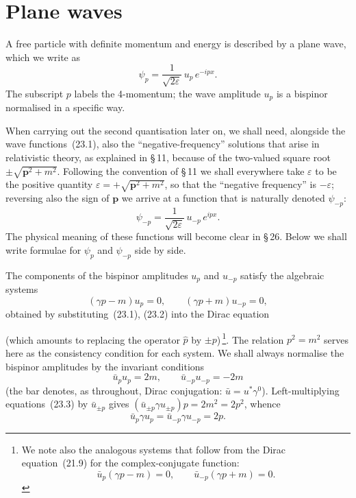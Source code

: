 \section{Plane waves}

A free particle with definite momentum and energy is described by a plane wave, which we write as
\begin{equation}
\psi_p = \frac{1}{\sqrt{2\varepsilon}}\,u_p\,e^{-ipx}.
\tag{23.1}
\end{equation}
The subscript $p$ labels the 4-momentum; the wave amplitude $u_p$ is a bispinor normalised in a specific way.

When carrying out the second quantisation later on, we shall need, alongside the wave functions~(23.1), also the ``negative-frequency'' solutions that arise in relativistic theory, as explained in \S\,11, because of the two-valued square root $\pm\sqrt{\mathbf{p}^2 + m^2}$. Following the convention of \S\,11 we shall everywhere take $\varepsilon$ to be the positive quantity $\varepsilon = +\sqrt{\mathbf{p}^2 + m^2}$, so that the ``negative frequency'' is $-\varepsilon$; reversing also the sign of $\mathbf{p}$ we arrive at a function that is naturally denoted $\psi_{-p}$:
\begin{equation}
\psi_{-p} = \frac{1}{\sqrt{2\varepsilon}}\,u_{-p}\,e^{ipx}.
\tag{23.2}
\end{equation}
The physical meaning of these functions will become clear in \S\,26. Below we shall write formulae for $\psi_p$ and $\psi_{-p}$ side by side.

The components of the bispinor amplitudes $u_p$ and $u_{-p}$ satisfy the algebraic systems
\begin{equation}
(\gamma p - m)u_p = 0,\qquad (\gamma p + m)u_{-p} = 0,
\tag{23.3}
\end{equation}
obtained by substituting~(23.1), (23.2) into the Dirac equation

(which amounts to replacing the operator $\widehat p$ by $\pm p$)\,\footnote{We note also the analogous systems that follow from the Dirac equation~(21.9) for the complex-conjugate function:
\begin{equation}
\bar u_p(\gamma p - m) = 0,\qquad \bar u_{-p}(\gamma p + m) = 0.
\tag{23.3\,a}
\end{equation}}. The relation $p^2 = m^2$ serves here as the consistency condition for each system. We shall always normalise the bispinor amplitudes by the invariant conditions
\begin{equation}
\bar u_p u_p = 2m,\qquad \bar u_{-p}u_{-p} = -2m
\tag{23.4}
\end{equation}
(the bar denotes, as throughout, Dirac conjugation: $\bar u = u^*\gamma^0$). Left-multiplying equations~(23.3) by $\bar u_{\pm p}$ gives $(\bar u_{\pm p}\gamma u_{\pm p})p = 2m^2 = 2p^2$, whence
\begin{equation}
\bar u_p\gamma u_p = \bar u_{-p}\gamma u_{-p} = 2p.
\tag{23.5}
\end{equation}


